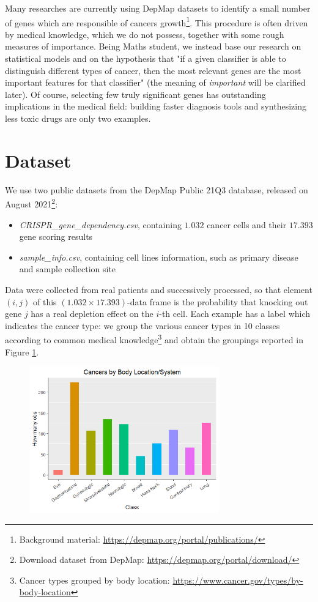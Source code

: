 \documentclass[a4paper,11pt, oneside]{article}  %
\begin{document}
Many researches are currently using DepMap datasets to identify a small number of genes which are responsible of cancers growth\footnote{Background material: \url{https://depmap.org/portal/publications/}}. This procedure is often driven by medical knowledge,  which we do not possess,  together with some rough measures of importance.  Being Maths student, we instead base our research on statistical models and on the hypothesis that "if a given classifier is able to distinguish different types of cancer,  then the most relevant genes are the most important features for that classifier" (the meaning of \textit{important} will be clarified later).  Of course,  selecting few truly significant genes has outstanding implications in the medical field: building faster diagnosis tools and synthesizing less toxic drugs are only two examples. 


\section{Dataset}
We use two public datasets from the DepMap Public 21Q3 database,  released on August 2021\footnote{Download dataset from DepMap:  \url{https://depmap.org/portal/download/}}:
\begin{itemize}
	\item \textit{CRISPR\_gene\_dependency.csv}, containing $1.032$ cancer cells and their $17.393$ gene scoring results
	\item \textit{sample\_info.csv}, containing cell lines information,  such as primary disease and sample collection site
\end{itemize}
Data were collected from real patients and successively processed,  so that element $(i, j)$ of this $(1.032 \times 17.393)$-data frame is the probability that knocking out gene $j$ has a real depletion effect on the $i$-th cell.  Each example has a label which indicates the cancer type:  we group the various cancer types in 10 classes according to common medical knowledge\footnote{Cancer types grouped by body location: \url{https://www.cancer.gov/types/by-body-location}} and obtain the groupings reported in Figure \ref{fig1}. 

\begin{figure}
	\includegraphics[width=0.73\textwidth]{plot1.png}
	\label{fig1}
\end{figure}
\end{document}
